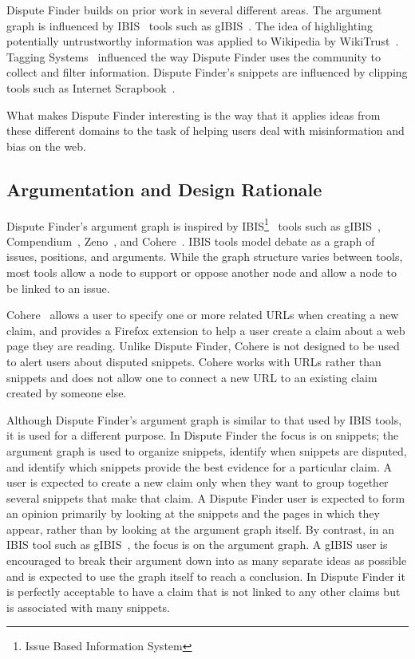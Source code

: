 \documentclass{www2010-submission}
\begin{document}
Dispute Finder builds on prior work in several different areas. The argument graph is influenced by IBIS~\cite{Rittel1973} tools such as gIBIS~\cite{Conklin1987a}. 
The idea of highlighting potentially untrustworthy information was applied to Wikipedia by WikiTrust~\cite{Adler2008a}. Tagging Systems~\cite{Marlow2006} influenced the way Dispute Finder uses the community to collect and filter information. Dispute Finder's snippets are influenced by clipping tools such as Internet Scrapbook~\cite{Sugiura1998}.

What makes Dispute Finder interesting is the way that it applies ideas from these different domains to the task of helping users deal with misinformation and bias on the web.

\subsection{Argumentation and Design Rationale}

Dispute Finder's argument graph is inspired by IBIS\footnote{Issue Based Information System}~\cite{Rittel1973} tools such as gIBIS~\cite{Conklin1987a}, Compendium~\cite{Selvin2001}, Zeno~\cite{Gordon1997}, and Cohere~\cite{Shum2008}. IBIS tools model debate as a graph of issues, positions, and arguments. While the graph structure varies between tools, most tools allow a node to support or oppose another node and allow a node to be linked to an issue. 

Cohere~\cite{Shum2008} allows a user to specify one or more related URLs when creating a new claim, and provides a Firefox extension to help a user create a claim about a web page they are reading. Unlike Dispute Finder, Cohere is not designed to be used to alert users about disputed snippets. Cohere works with URLs rather than snippets and does not allow one to connect a new URL to an existing claim created by someone else. 

Although Dispute Finder's argument graph is similar to that used by IBIS tools, it is used for a different purpose. 
In Dispute Finder the focus is on snippets; the argument graph is used to organize snippets, identify when snippets are disputed, and identify which snippets provide the best evidence for a particular claim. 
A user is expected to create a new claim only when they want to group together several snippets that make that claim. 
A Dispute Finder user is expected to form an opinion primarily by looking at the snippets and the pages in which they appear, rather than by looking at the argument graph itself. By contrast, in an IBIS tool such as gIBIS~\cite{Conklin1987a}, the focus is on the argument graph. A gIBIS user is encouraged to break their argument down into as many separate ideas as possible and is expected to use the graph itself to reach a conclusion. In Dispute Finder it is perfectly acceptable to have a claim that is not linked to any other claims but is associated with many snippets.
\end{document}
